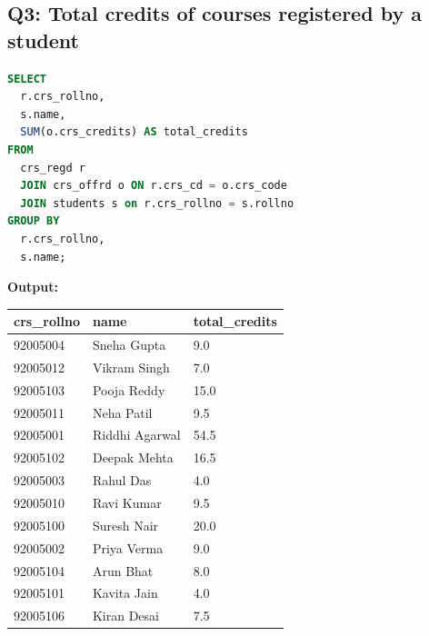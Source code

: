 \documentclass[11pt, a4paper]{article}
\begin{document}
\subsection*{Q3: Total credits of courses registered by a student}
\begin{lstlisting}[language=SQL]
SELECT
  r.crs_rollno,
  s.name,
  SUM(o.crs_credits) AS total_credits
FROM
  crs_regd r
  JOIN crs_offrd o ON r.crs_cd = o.crs_code
  JOIN students s on r.crs_rollno = s.rollno
GROUP BY
  r.crs_rollno,
  s.name;
\end{lstlisting}
\vspace{0.3cm}
\textbf{Output:}\vspace{0.2cm}
\begin{center}
\begin{tabular}{|l|l|l|}
\hline
\textbf{crs\_rollno} & \textbf{name} & \textbf{total\_credits} \\ \hline
92005004 & Sneha Gupta                    & 9.0 \\ \hline
92005012 & Vikram Singh                   & 7.0 \\ \hline
92005103 & Pooja Reddy                    & 15.0 \\ \hline
92005011 & Neha Patil                     & 9.5 \\ \hline
92005001 & Riddhi Agarwal                 & 54.5 \\ \hline
92005102 & Deepak Mehta                   & 16.5 \\ \hline
92005003 & Rahul Das                      & 4.0 \\ \hline
92005010 & Ravi Kumar                     & 9.5 \\ \hline
92005100 & Suresh Nair                    & 20.0 \\ \hline
92005002 & Priya Verma                    & 9.0 \\ \hline
92005104 & Arun Bhat                      & 8.0 \\ \hline
92005101 & Kavita Jain                    & 4.0 \\ \hline
92005106 & Kiran Desai                    & 7.5 \\ \hline
\end{tabular}
\end{center}
\newpage
\end{document}
